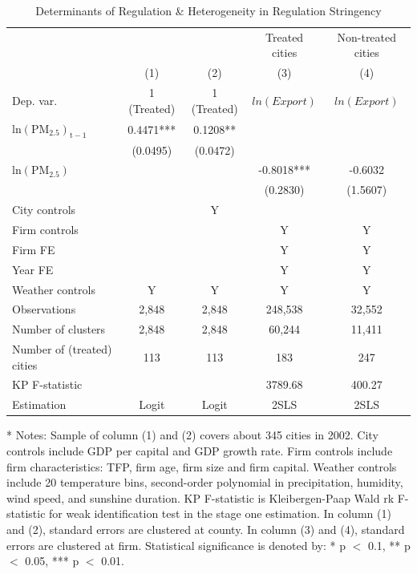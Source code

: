 \documentclass[12pt]{article}
\begin{document}
          \begin{table}[H]\centering
    \caption{Determinants of Regulation \& Heterogeneity in Regulation Stringency} \label{tab:hetero_cost}
    \footnotesize
    \begin{tabular}{l*{4}{c}}
      \hline\hline
      &\multicolumn{1}{c}{}&\multicolumn{1}{c}{}&\multicolumn{1}{c}{Treated cities}&\multicolumn{1}{c}{Non-treated cities}\\
      &\multicolumn{1}{c}{(1)}&\multicolumn{1}{c}{(2)}&\multicolumn{1}{c}{(3)}&\multicolumn{1}{c}{(4)}\\
      Dep. var. &\multicolumn{1}{c}{1 (Treated)}&\multicolumn{1}{c}{1 (Treated)}&\multicolumn{1}{c}{$ln(Export)$}&\multicolumn{1}{c}{$ln(Export)$}\\
      \hline
      $\mathrm{ln(PM_{2.5})_{t-1}}$     &0.4471***&0.1208**&&\\
                                        &(0.0495)&(0.0472)&&\\
      $\mathrm{ln(PM_{2.5})}$           & &       &-0.8018***&-0.6032\\
                                        & &       &(0.2830)&(1.5607)\\
    \hline
      City controls   &&Y&&\\
      Firm controls   &&&Y&Y\\
      Firm FE         &&&Y&Y\\
      Year FE         &&&Y&Y\\
      Weather controls &Y&Y&Y&Y\\
    \hline
      Observations	           &2,848&2,848&248,538&32,552 \\
      Number of clusters         &2,848 &2,848&60,244&11,411\\
      Number of (treated) cities &113 & 113 &183&247\\
      KP F-statistic	           &	&     &3789.68&400.27\\
      Estimation                 &Logit&Logit&2SLS&2SLS\\
      \hline\hline
  \end{tabular}
  \begin{tablenotes}
    \item[*] \small Notes: Sample of column (1) and (2) covers about 345 cities in 2002. City controls include GDP per capital and GDP growth rate. Firm controls include firm characteristics: TFP, firm age, firm size and firm capital. Weather controls include 20 temperature bins, second-order polynomial in precipitation, humidity, wind speed, and sunshine duration. KP F-statistic is Kleibergen-Paap Wald rk F-statistic for weak identification test in the stage one estimation. In column (1) and (2), standard errors are clustered at county. In column (3) and (4), standard errors are clustered at firm. Statistical significance is denoted by: * p $<$ 0.1, ** p $<$ 0.05, *** p $<$ 0.01.
  \end{tablenotes}
  \end{table}
\end{document}

